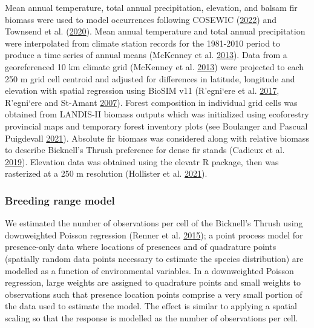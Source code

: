 \documentclass[12pt]{article}
\begin{document}
Mean annual temperature, total annual precipitation, elevation, and
balsam fir biomass were used to model occurrences following COSEWIC
(\protect\hyperlink{ref-cosewic_cosewic_2022}{2022}) and Townsend et al.
(\protect\hyperlink{ref-billerman_bicknells_2020}{2020}). Mean annual
temperature and total annual precipitation were interpolated from
climate station records for the 1981-2010 period to produce a time
series of annual means (McKenney et al.
\protect\hyperlink{ref-mckenney_spatial_2013}{2013}). Data from a
georeferenced 10 km climate grid (McKenney et al.
\protect\hyperlink{ref-mckenney_spatial_2013}{2013}) were projected to
each 250 m grid cell centroid and adjusted for differences in latitude,
longitude and elevation with spatial regression using BioSIM v11
(R\a'egni\a`ere et al.
\protect\hyperlink{ref-regniere_biosim_2017}{2017}, R\a'egni\a`ere and
St-Amant \protect\hyperlink{ref-regniere_stochastic_2007}{2007}). Forest
composition in individual grid cells was obtained from LANDIS-II biomass
outputs which was initialized using ecoforestry provincial maps and
temporary forest inventory plots (see Boulanger and Pascual Puigdevall
\protect\hyperlink{ref-boulanger_boreal_2021}{2021}). Absolute fir
biomass was considered along with relative biomass to describe
Bicknell's Thrush preference for dense fir stands (Cadieux et al.
\protect\hyperlink{ref-cadieux_spatially_2019}{2019}). Elevation data
was obtained using the elevatr R package, then was rasterized at a 250 m
resolution (Hollister et al.
\protect\hyperlink{ref-hollister_elevatr_2021}{2021}).

\hypertarget{breeding-range-model}{%
\subsubsection{Breeding range model}\label{breeding-range-model}}

We estimated the number of observations per cell of the Bicknell's
Thrush using downweighted Poisson regression (Renner et al.
\protect\hyperlink{ref-renner_point_2015}{2015}); a point process model
for presence-only data where locations of presences and of quadrature
points (spatially random data points necessary to estimate the species
distribution) are modelled as a function of environmental variables. In
a downweighted Poisson regression, large weights are assigned to
quadrature points and small weights to observations such that presence
location points comprise a very small portion of the data used to
estimate the model. The effect is similar to applying a spatial scaling
so that the response is modelled as the number of observations per cell.
\end{document}
